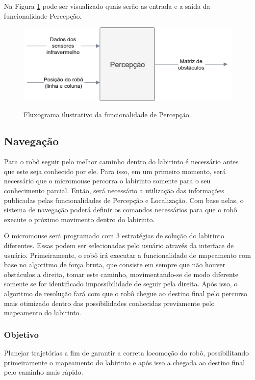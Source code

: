 Na Figura \ref{fig:especificacao_funcional_percepcao} pode ser visualizado quais serão as entrada e a saída da funcionalidade Percepção.

\begin{figure}[H]
	\centering
	\caption{Fluxograma ilustrativo da funcionalidade de Percepção.}
	\includegraphics[width=1\textwidth]
	{Figures/especificacao_funcional_percepcao}
	\label{fig:especificacao_funcional_percepcao}
\end{figure}

\subsection{Navegação}
\label{ssec:funcionalidade_navegacao} 
Para o robô seguir pelo melhor caminho dentro do labirinto é necessário antes que este seja conhecido por ele. Para isso, em um primeiro momento, será necessário que o micromouse percorra o labirinto somente para o seu conhecimento parcial. Então, será necessário a utilização das informações publicadas pelas funcionalidades de Percepção e Localização. Com base nelas, o sistema de navegação poderá definir os comandos necessários para que o robô execute o próximo movimento dentro do labirinto.

O micromouse será programado com 3 estratégias de solução do labirinto diferentes. Essas podem ser selecionadas pelo usuário através da interface de usuário. Primeiramente, o robô irá executar a funcionalidade de mapeamento com base no algoritmo de força bruta, que consiste em sempre que não houver obstáculos a direita, tomar este caminho, movimentando-se de modo diferente somente se for identificado impossibilidade de seguir pela direita. Após isso, o algoritmo de resolução fará com que o robô chegue ao destino final pelo percurso mais otimizado dentro das possibilidades conhecidas previamente pelo mapeamento do labirinto.

\subsubsection{Objetivo}
Planejar trajetórias a fim de garantir a correta locomoção do robô, possibilitando primeiramente o mapeamento do labirinto e após isso a chegada ao destino final pelo caminho mais rápido.

